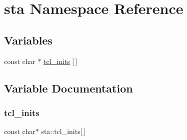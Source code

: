\hypertarget{namespacesta}{}\section{sta Namespace Reference}
\label{namespacesta}
\subsection*{Variables}
\begin{DoxyCompactItemize}
\item 
const char $\ast$ \hyperlink{namespacesta_a25423e815a38020350ff9ec056668087}{tcl\+\_\+inits} \mbox{[}$\,$\mbox{]}
\end{DoxyCompactItemize}


\subsection{Variable Documentation}
\mbox{\label{namespacesta_a25423e815a38020350ff9ec056668087}} 
\subsubsection{\texorpdfstring{tcl\+\_\+inits}{tcl\_inits}}
{\footnotesize\ttfamily const char$\ast$ sta\+::tcl\+\_\+inits\mbox{[}$\,$\mbox{]}}


